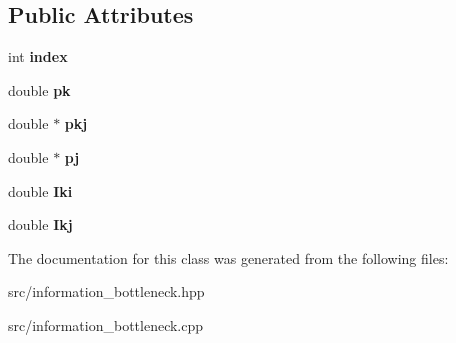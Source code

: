 \subsection*{Public Attributes}
\begin{DoxyCompactItemize}
\item 
\hypertarget{classBottleneckObjectiveValue_a6229987020b8634ca238bb7d6d8904db}{int {\bfseries index}}\label{classBottleneckObjectiveValue_a6229987020b8634ca238bb7d6d8904db}

\item 
\hypertarget{classBottleneckObjectiveValue_a0e9546f57c845f33372ac3db29f8ea25}{double {\bfseries pk}}\label{classBottleneckObjectiveValue_a0e9546f57c845f33372ac3db29f8ea25}

\item 
\hypertarget{classBottleneckObjectiveValue_ac823f5e398f9ae9c75fe9151b29aac5b}{double $\ast$ {\bfseries pkj}}\label{classBottleneckObjectiveValue_ac823f5e398f9ae9c75fe9151b29aac5b}

\item 
\hypertarget{classBottleneckObjectiveValue_ac6c6fa26dac3f438159c5c7c6f1b4f3b}{double $\ast$ {\bfseries pj}}\label{classBottleneckObjectiveValue_ac6c6fa26dac3f438159c5c7c6f1b4f3b}

\item 
\hypertarget{classBottleneckObjectiveValue_a227ccad30a07de0b38e4678940b06338}{double {\bfseries Iki}}\label{classBottleneckObjectiveValue_a227ccad30a07de0b38e4678940b06338}

\item 
\hypertarget{classBottleneckObjectiveValue_a40c60ab77263afa0738968433d2d425f}{double {\bfseries Ikj}}\label{classBottleneckObjectiveValue_a40c60ab77263afa0738968433d2d425f}

\end{DoxyCompactItemize}


The documentation for this class was generated from the following files\-:\begin{DoxyCompactItemize}
\item 
src/information\-\_\-bottleneck.\-hpp\item 
src/information\-\_\-bottleneck.\-cpp\end{DoxyCompactItemize}
